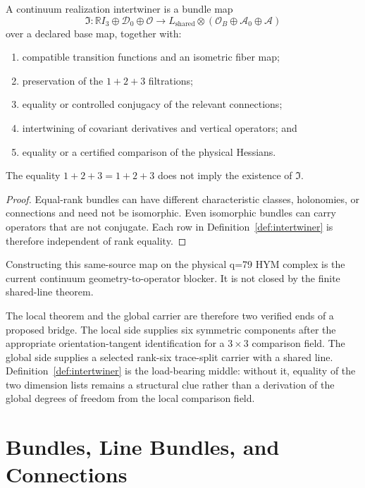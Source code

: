 \documentclass[11pt]{article}
\newcommand{\Lshared}{L_{\mathrm{shared}}}
\newcommand{\Atrace}{\mathcal A_0}
\newcommand{\Acover}{\mathcal A}
\newcommand{\Dzero}{\mathcal D_0}
\newcommand{\Off}{\mathcal O}
\begin{document}
\begin{definition}\label{def:intertwiner}
A continuum realization intertwiner is a bundle map
\[
 \mathfrak I:
 \mathbb RI_3\oplus\Dzero\oplus\Off
 \longrightarrow
 \Lshared\otimes
 \left(\mathcal O_B\oplus\Atrace\oplus\Acover\right)
\]
over a declared base map, together with:
\begin{enumerate}
\item compatible transition functions and an isometric fiber map;
\item preservation of the $1+2+3$ filtrations;
\item equality or controlled conjugacy of the relevant connections;
\item intertwining of covariant derivatives and vertical operators; and
\item equality or a certified comparison of the physical Hessians.
\end{enumerate}
\end{definition}

\begin{proposition}
The equality $1+2+3=1+2+3$ does not imply the existence of
$\mathfrak I$.
\end{proposition}

\begin{proof}
Equal-rank bundles can have different characteristic classes, holonomies, or
connections and need not be isomorphic.  Even isomorphic bundles can carry
operators that are not conjugate.  Each row in
Definition~\ref{def:intertwiner} is therefore independent of rank equality.
\end{proof}

Constructing this same-source map on the physical q=79 HYM complex is the
current continuum geometry-to-operator blocker.  It is not closed by the
finite shared-line theorem.

The local theorem and the global carrier are therefore two verified ends of a
proposed bridge. The local side supplies six symmetric components after
the appropriate orientation-tangent identification for a $3\times3$
comparison field. The global side supplies a selected rank-six trace-split carrier with
a shared line.  Definition~\ref{def:intertwiner} is the load-bearing middle:
without it, equality of the two dimension lists remains a structural clue
rather than a derivation of the global degrees of freedom from the local
comparison field.

\section{Bundles, Line Bundles, and Connections}
\end{document}

